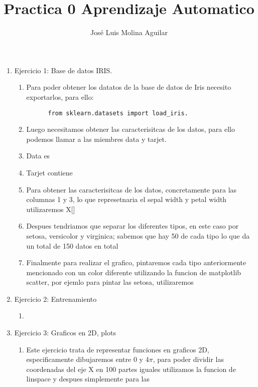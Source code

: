 \documentclass[12pt]{article}
\begin{document}
\title{Practica 0 Aprendizaje Automatico}
\author{José Luis Molina Aguilar\newline }
\date{}


\maketitle

\begin{enumerate}
  \item[] Ejercicio 1: Base de datos IRIS.
  \begin{enumerate}
    \item[] Para poder obtener los datatos de la base de datos de Iris necesito exportarlos, para ello:
    \begin{lstlisting}
      from sklearn.datasets import load_iris. 
    \end{lstlisting}
    \item[] Luego necesitamos obtener las caracterisitcas de los datos, para ello podemos llamar a las miembres data y tarjet.
    \item[] Data es 
    \item[] Tarjet contiene
    \item[] Para obtener las caracterisitcas de los datos, concretamente para las columnas 1 y 3, lo que represetnaria el sepal width y petal width utilizaremos X[]
    \item[] Despues tendriamos que separar los diferentes tipos, en este caso por setosa, versicolor y virginica; sabemos que hay 50 de cada tipo lo que da un total de 150 datos en total
    \item[] Finalmente para realizar el grafico, pintaremos cada tipo anteriormente mencionado con un color diferente utilizando la funcion de matplotlib scatter, por ejemlo para pintar las setosa, utilizaremos  
  \end{enumerate} 
  \item[] Ejercicio 2: Entrenamiento
  \begin{enumerate}
    \item 
  \end{enumerate} 
  \item[] Ejercicio 3: Graficos en 2D, plots
  \begin{enumerate}
    \item[] Este ejercicio trata de representar funciones en graficos 2D, especificamente dibujaremos entre 0 y 4$\pi$, para poder dividir las coordenadas del eje X en 100 partes iguales utilizamos la funcion de linspace y despues simplemente para las 

\end{enumerate}
\end{enumerate}
\end{document}
